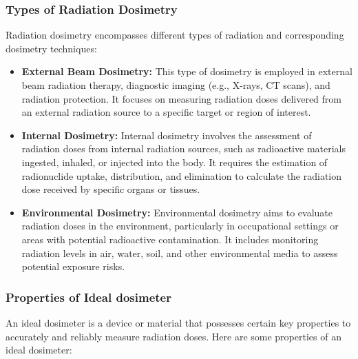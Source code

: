 \documentclass[../introduction.tex]{subfiles}
\begin{document}
    \subsubsection*{\large Types of Radiation Dosimetry}
        Radiation dosimetry encompasses different types of radiation and corresponding dosimetry techniques:
        \begin{itemize}
            \item \textbf{External Beam Dosimetry: } This type of dosimetry is employed in external beam radiation 
            therapy, diagnostic imaging (e.g., X-rays, CT scans), and radiation protection. It focuses on measuring 
            radiation doses delivered from an external radiation source to a specific target or region of interest.

            \item \textbf{Internal Dosimetry: } Internal dosimetry involves the assessment of radiation doses from 
            internal radiation sources, such as radioactive materials ingested, inhaled, or injected into the body. 
            It requires the estimation of radionuclide uptake, distribution, and elimination to calculate the radiation 
            dose received by specific organs or tissues.

            \item \textbf{Environmental Dosimetry: } Environmental dosimetry aims to evaluate radiation doses in the 
            environment, particularly in occupational settings or areas with potential radioactive contamination. It 
            includes monitoring radiation levels in air, water, soil, and other environmental media to assess potential 
            exposure risks.

        \end{itemize}

    \subsubsection*{\large Properties of Ideal dosimeter}
        An ideal dosimeter is a device or material that possesses certain key properties to accurately and 
        reliably measure radiation doses. Here are some properties of an ideal dosimeter\cite{b7}:
\end{document}
